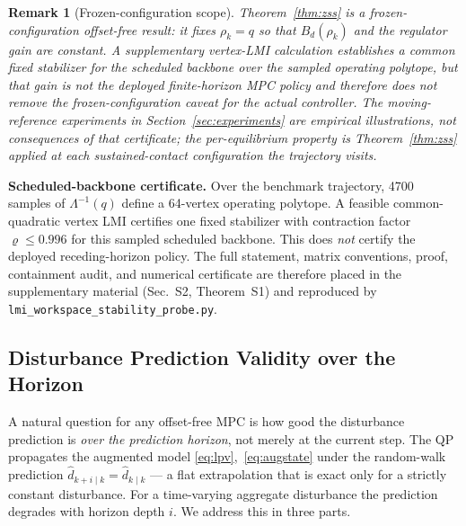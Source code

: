\documentclass[journal]{IEEEtran}
\newtheorem{remark}{Remark}
\newcommand{\dhat}{\hat{d}}
\begin{document}
\begin{remark}[Frozen-configuration scope]
Theorem~\ref{thm:zss} is a \emph{frozen-configuration} offset-free result:
it fixes $\rho_k=q$ so that $B_d(\rho_k)$ and the regulator gain are
constant. A supplementary vertex-LMI calculation establishes a common fixed
stabilizer for the scheduled backbone over the sampled operating polytope, but
that gain is not the deployed finite-horizon MPC policy and therefore does not
remove the frozen-configuration caveat for the actual controller. The
moving-reference experiments in Section~\ref{sec:experiments} are empirical
illustrations, not consequences of that certificate; the per-equilibrium property is
Theorem~\ref{thm:zss} applied at each sustained-contact configuration the
trajectory visits.
\end{remark}

\textbf{Scheduled-backbone certificate.}
Over the benchmark trajectory, 4700 samples of $\Lambda^{-1}(q)$ define a
64-vertex operating polytope. A feasible common-quadratic vertex LMI certifies
one fixed stabilizer with contraction factor $\varrho\le0.996$ for this sampled
scheduled backbone. This does \emph{not} certify the deployed receding-horizon
policy. The full statement, matrix conventions, proof, containment audit, and
numerical certificate are therefore placed in the supplementary material
(Sec.~S2, Theorem~S1) and reproduced by
\texttt{lmi\_workspace\_stability\_probe.py}.

\subsection{Disturbance Prediction Validity over the Horizon}

A natural question for any offset-free MPC is how good the disturbance
prediction is \emph{over the prediction horizon}, not merely at the current
step. The QP propagates the augmented model
\eqref{eq:lpv},~\eqref{eq:augstate} under the random-walk prediction
$\dhat_{k+i\mid k}=\dhat_{k\mid k}$ --- a flat extrapolation that is exact only
for a strictly constant disturbance. For a time-varying aggregate disturbance
the prediction degrades with horizon depth $i$. We address this in three parts.
\end{document}
